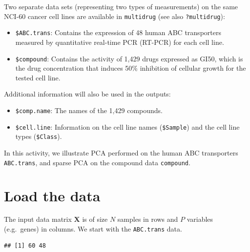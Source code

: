 \documentclass[]{book}
\newenvironment{Shaded}{\begin{snugshade}}{\end{snugshade}}
\newcommand{\CommentTok}[1]{\textcolor[rgb]{0.56,0.35,0.01}{\textit{#1}}}
\newcommand{\KeywordTok}[1]{\textcolor[rgb]{0.13,0.29,0.53}{\textbf{#1}}}
\newcommand{\NormalTok}[1]{#1}
\newcommand{\OperatorTok}[1]{\textcolor[rgb]{0.81,0.36,0.00}{\textbf{#1}}}
\newcommand{\StringTok}[1]{\textcolor[rgb]{0.31,0.60,0.02}{#1}}
\begin{document}
Two separate data sets (representing two types of measurements) on the same NCI-60 cancer cell lines are available in \texttt{multidrug} (see also \texttt{?multidrug}):

\begin{itemize}
\item
  \texttt{\$ABC.trans}: Contains the expression of 48 human ABC transporters measured by quantitative real-time PCR (RT-PCR) for each cell line.
\item
  \texttt{\$compound}: Contains the activity of 1,429 drugs expressed as GI50, which is the drug concentration that induces 50\% inhibition of cellular growth for the tested cell line.
\end{itemize}

Additional information will also be used in the outputs:

\begin{itemize}
\item
  \texttt{\$comp.name}: The names of the 1,429 compounds.
\item
  \texttt{\$cell.line}: Information on the cell line names (\texttt{\$Sample}) and the cell line types (\texttt{\$Class}).
\end{itemize}

In this activity, we illustrate PCA performed on the human ABC transporters \texttt{ABC.trans}, and sparse PCA on the compound data \texttt{compound}.

\hypertarget{pca:load}{%
\section{Load the data}\label{pca:load}}

The input data matrix \(\boldsymbol{X}\) is of size \(N\) samples in rows and \(P\) variables (e.g.~genes) in columns. We start with the \texttt{ABC.trans} data.

\begin{Shaded}
\end{Shaded}

\begin{verbatim}
## [1] 60 48
\end{verbatim}
\end{document}

